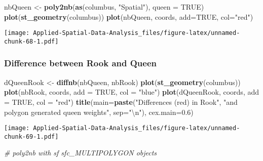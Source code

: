 \documentclass[
]{book}
\newenvironment{Shaded}{\begin{snugshade}}{\end{snugshade}}
\newcommand{\CharTok}[1]{\textcolor[rgb]{0.31,0.60,0.02}{#1}}
\newcommand{\CommentTok}[1]{\textcolor[rgb]{0.56,0.35,0.01}{\textit{#1}}}
\newcommand{\DataTypeTok}[1]{\textcolor[rgb]{0.13,0.29,0.53}{#1}}
\newcommand{\FloatTok}[1]{\textcolor[rgb]{0.00,0.00,0.81}{#1}}
\newcommand{\KeywordTok}[1]{\textcolor[rgb]{0.13,0.29,0.53}{\textbf{#1}}}
\newcommand{\NormalTok}[1]{#1}
\newcommand{\OtherTok}[1]{\textcolor[rgb]{0.56,0.35,0.01}{#1}}
\newcommand{\StringTok}[1]{\textcolor[rgb]{0.31,0.60,0.02}{#1}}
\begin{document}
\begin{Shaded}
\begin{Highlighting}[]
\NormalTok{nbQueen <-}\StringTok{ }\KeywordTok{poly2nb}\NormalTok{(}\KeywordTok{as}\NormalTok{(columbus, }\StringTok{"Spatial"}\NormalTok{), }\DataTypeTok{queen =} \OtherTok{TRUE}\NormalTok{)}
\KeywordTok{plot}\NormalTok{(}\KeywordTok{st_geometry}\NormalTok{(columbus))}
\KeywordTok{plot}\NormalTok{(nbQueen, coords, }\DataTypeTok{add=}\OtherTok{TRUE}\NormalTok{, }\DataTypeTok{col=}\StringTok{"red"}\NormalTok{)}
\end{Highlighting}
\end{Shaded}

\texttt{[image: Applied-Spatial-Data-Analysis\_files/figure-latex/unnamed-chunk-68-1.pdf]}

\hypertarget{difference-between-rook-and-queen}{%
\subsubsection{Difference between Rook and Queen}\label{difference-between-rook-and-queen}}

\begin{Shaded}
\begin{Highlighting}[]
\NormalTok{dQueenRook <-}\StringTok{ }\KeywordTok{diffnb}\NormalTok{(nbQueen, nbRook)}
\KeywordTok{plot}\NormalTok{(}\KeywordTok{st_geometry}\NormalTok{(columbus))}
\KeywordTok{plot}\NormalTok{(nbRook, coords, }\DataTypeTok{add =} \OtherTok{TRUE}\NormalTok{, }\DataTypeTok{col =} \StringTok{"blue"}\NormalTok{)}
\KeywordTok{plot}\NormalTok{(dQueenRook, coords, }\DataTypeTok{add =} \OtherTok{TRUE}\NormalTok{, }\DataTypeTok{col =} \StringTok{"red"}\NormalTok{)}
\KeywordTok{title}\NormalTok{(}\DataTypeTok{main=}\KeywordTok{paste}\NormalTok{(}\StringTok{"Differences (red) in Rook"}\NormalTok{,}
 \StringTok{"and polygon generated queen weights"}\NormalTok{, }\DataTypeTok{sep=}\StringTok{"}\CharTok{\textbackslash{}n}\StringTok{"}\NormalTok{), }\DataTypeTok{cex.main=}\FloatTok{0.6}\NormalTok{)}
\end{Highlighting}
\end{Shaded}

\texttt{[image: Applied-Spatial-Data-Analysis\_files/figure-latex/unnamed-chunk-69-1.pdf]}

\begin{Shaded}
\begin{Highlighting}[]
\CommentTok{# poly2nb with sf sfc_MULTIPOLYGON objects}
\end{Highlighting}
\end{Shaded}
\end{document}
